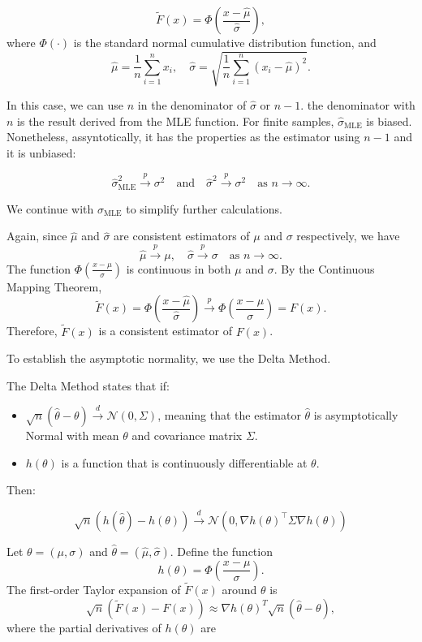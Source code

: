\documentclass{article}
\begin{document}
\[
\tilde{F}(x) = \Phi\left( \frac{x - \hat{\mu}}{\hat{\sigma}} \right),
\]
where \( \Phi(\cdot) \) is the standard normal cumulative distribution function, and
\[
\hat{\mu} = \frac{1}{n} \sum_{i=1}^n x_i, \quad \hat{\sigma} = \sqrt{\frac{1}{n} \sum_{i=1}^n (x_i - \hat{\mu})^2}.
\]

In this case, we can use $n$ in the denominator of $\hat{\sigma}$ or $n-1$. the denominator with $n$ is the result derived from the MLE function. For finite samples, $\hat{\sigma}_{\text{MLE}}$ is biased. Nonetheless, assyntotically, it has the properties as the estimator using $n-1$ and it is unbiased:

\[
\hat{\sigma}_{\text{MLE}}^2 \xrightarrow{p} \sigma^2 \quad \text{and} \quad \hat{\sigma}^2 \xrightarrow{p} \sigma^2 \quad \text{as } n \to \infty.
\]

We continue with $\hat{\sigma}_{\text{MLE}}$ to simplify further calculations.

Again, since \( \hat{\mu} \) and \( \hat{\sigma} \) are consistent estimators of \( \mu \) and \( \sigma \) respectively, we have
\[
\hat{\mu} \xrightarrow{p} \mu, \quad \hat{\sigma} \xrightarrow{p} \sigma \quad \text{as } n \to \infty.
\]
The function \( \Phi\left( \frac{x - \mu}{\sigma} \right) \) is continuous in both \( \mu \) and \( \sigma \). By the Continuous Mapping Theorem,
\[
\tilde{F}(x) = \Phi\left( \frac{x - \hat{\mu}}{\hat{\sigma}} \right) \xrightarrow{p} \Phi\left( \frac{x - \mu}{\sigma} \right) = F(x).
\]
Therefore, \( \tilde{F}(x) \) is a consistent estimator of \( F(x) \).

To establish the asymptotic normality, we use the Delta Method.

The Delta Method states that if:
\begin{itemize}
  \item \( \sqrt{n} (\hat{\theta} - \theta) \xrightarrow{d} \mathcal{N}(0, \Sigma) \), meaning that the estimator  $\hat{\theta}$  is asymptotically Normal with mean  $\theta$  and covariance matrix  $\Sigma$.
  \item $h(\theta)$  is a function that is continuously differentiable at  $\theta $.
\end{itemize}

Then:

$$
\sqrt{n} (h(\hat{\theta}) - h(\theta)) \xrightarrow{d} \mathcal{N}(0, \nabla h(\theta)^\top \Sigma \nabla h(\theta))
$$


Let \( \theta = (\mu, \sigma) \) and \( \hat{\theta} = (\hat{\mu}, \hat{\sigma}) \). Define the function
\[
h(\theta) = \Phi\left( \frac{x - \mu}{\sigma} \right).
\]
The first-order Taylor expansion of \( \tilde{F}(x) \) around \( \theta \) is
\[
\sqrt{n} \left( \tilde{F}(x) - F(x) \right) \approx \nabla h(\theta)^T \sqrt{n} (\hat{\theta} - \theta),
\]
where the partial derivatives of \( h(\theta) \) are
\end{document}
